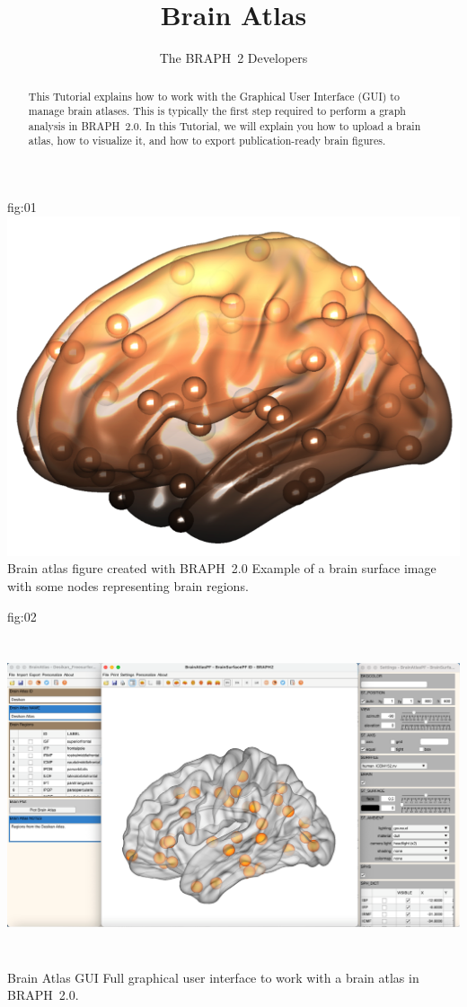 \documentclass[justified]{tufte-handout}
\title{Brain Atlas}
\author[The BRAPH~2 Developers]{The BRAPH~2 Developers}
\begin{document}
\maketitle
	
	{fig:01}
	{\includegraphics{tut_ba/fig01.png}}
	{Brain atlas figure created with BRAPH~2.0}
	{
	Example of a brain surface image with some nodes representing brain regions.
	}

\begin{abstract}
\noindent
This Tutorial explains how to work with the Graphical User Interface (GUI) to manage brain atlases.
This is typically the first step required to perform a graph analysis in BRAPH~2.0. 
In this Tutorial, we will explain you how to upload a brain atlas, how to visualize it, and how to export publication-ready brain figures.
\end{abstract}

\tableofcontents

	{fig:02}
	{\includegraphics[height=10cm]{tut_ba/fig02.png}}
	{Brain Atlas GUI}
	{
	Full graphical user interface to work with a brain atlas in BRAPH~2.0. 
	}
\end{document}

